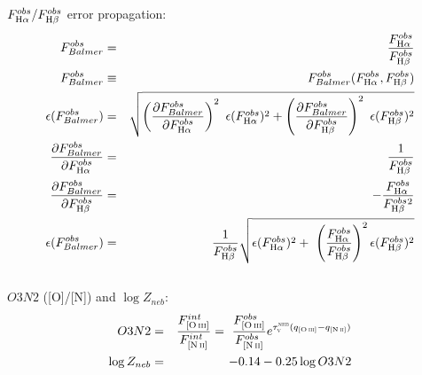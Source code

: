 \documentclass[a4paper,12pt]{article}
\newcommand{\tauVN}{\tau_{\mathrm{\textsc{v}}}^{\mathrm{\textsc{neb}}}}
\newcommand{\Halpha}{\ifmmode \mathrm{H}\alpha \else H$\alpha$\xspace \fi}
\newcommand{\Hbeta}{\ifmmode \mathrm{H}\beta \else H$\beta$\xspace \fi}
\newcommand{\nII}{\ifmmode [\mathrm{N\,\textsc{ii}}] \else [N\thinspace\textsc{ii}]\xspace \fi}
\newcommand{\oIII}{\ifmmode [\mathrm{O\,\textsc{iii}}] \else [O\thinspace{\sc iii}]\xspace \fi}
\newcommand{\del}[2]{\frac{\partial #1}{\partial #2}}
\begin{document}
$F_{\Halpha}^{obs} / F_{\Hbeta}^{obs}$ error propagation:
\begin{eqnarray}
	F_{Balmer}^{obs} &=& \frac{F_{\Halpha}^{obs}}{F_{\Hbeta}^{obs}} \\
	F_{Balmer}^{obs} &\equiv& F_{Balmer}^{obs}(F_{\Halpha}^{obs}, F_{\Hbeta}^{obs}) \\
	\epsilon(F_{Balmer}^{obs}) &=& \sqrt{\left(\del{F_{Balmer}^{obs}}{F_{\Halpha}^{obs}}\right)^2 \
\epsilon(F_{\Halpha}^{obs})^2 + \left(\del{F_{Balmer}^{obs}}{F_{\Hbeta}^{obs}}\right)^2 \
\epsilon(F_{\Hbeta}^{obs})^2} \\
	\del{F_{Balmer}^{obs}}{F_{\Halpha}^{obs}} &=& \frac{1}{F_{\Hbeta}^{obs}} \\
	\del{F_{Balmer}^{obs}}{F_{\Hbeta}^{obs}} &=& - \frac{F_{\Halpha}^{obs}}{F_{\Hbeta}^{obs}{}^2} \\
	\epsilon(F_{Balmer}^{obs}) &=& \frac{1}{F_{\Hbeta}^{obs}} \sqrt{\epsilon(F_{\Halpha}^{obs})^2 + \
\left(\frac{F_{\Halpha}^{obs}}{F_{\Hbeta}^{obs}}\right)^2 \epsilon(F_{\Hbeta}^{obs})^2} 
\end{eqnarray}
\\

$O3N2$ ([O]/[N]) and $\log Z_{neb}$:
\begin{eqnarray}
	O3N2 &=& \frac{F_{\oIII}^{int}}{F_{\nII}^{int}} = \
\frac{F_{\oIII}^{obs}}{F_{\nII}^{obs}} e^{\tauVN (q_{\oIII} - q_{\nII})} \\
	\log Z_{neb} &=& - 0.14 - 0.25 \log O3N2 \\
\end{eqnarray}
\\
\end{document}
